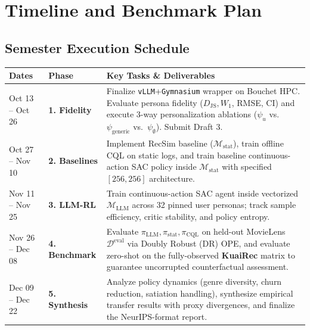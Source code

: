 \documentclass{article}
\begin{document}
\section{Timeline and Benchmark Plan}

\subsection{Semester Execution Schedule}
\begin{table}[h]
\centering
\label{tab:timeline}
\footnotesize
\renewcommand{\arraystretch}{0.92}
\begin{tabular}{@{}llp{9.3cm}@{}}
\toprule
\textbf{Dates} & \textbf{Phase} & \textbf{Key Tasks \& Deliverables} \\ \midrule
Oct 13 -- Oct 26 & \textbf{1. Fidelity} & Finalize \texttt{vLLM}+\texttt{Gymnasium} wrapper on Bouchet HPC. Evaluate persona fidelity ($D_{\text{JS}}, W_1$, RMSE, $\text{CI}$) and execute 3-way personalization ablations ($\psi_u$ vs.\ $\psi_{\text{generic}}$ vs.\ $\psi_{\emptyset}$). Submit Draft 3. \\ \addlinespace[1pt]
Oct 27 -- Nov 10 & \textbf{2. Baselines} & Implement RecSim baseline ($\mathcal{M}_{\text{stat}}$), train offline CQL on static logs, and train baseline continuous-action SAC policy inside $\mathcal{M}_{\text{stat}}$ with specified $[256, 256]$ architecture. \\ \addlinespace[1pt]
Nov 11 -- Nov 25 & \textbf{3. LLM-RL} & Train continuous-action SAC agent inside vectorized $\mathcal{M}_{\text{LLM}}$ across 32 pinned user personas; track sample efficiency, critic stability, and policy entropy. \\ \addlinespace[1pt]
Nov 26 -- Dec 08 & \textbf{4. Benchmark} & Evaluate $\pi_{\text{LLM}}, \pi_{\text{stat}}, \pi_{\text{CQL}}$ on held-out MovieLens $\mathcal{D}^{\text{eval}}$ via Doubly Robust (DR) OPE, and evaluate zero-shot on the fully-observed \textbf{KuaiRec} matrix to guarantee uncorrupted counterfactual assessment. \\ \addlinespace[1pt]
Dec 09 -- Dec 22 & \textbf{5. Synthesis} & Analyze policy dynamics (genre diversity, churn reduction, satiation handling), synthesize empirical transfer results with proxy divergences, and finalize the NeurIPS-format report. \\ \bottomrule
\end{tabular}
\end{table}
\end{document}
